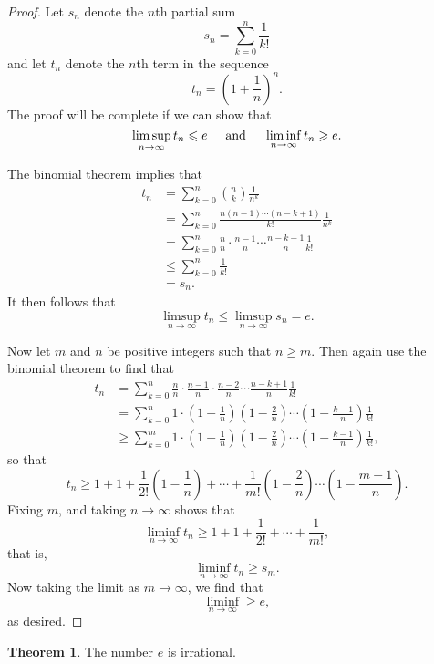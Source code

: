\documentclass[12pt]{article}
\theoremstyle{definition}
\theoremstyle{theorem}
\newtheorem{theorem}[definition]{Theorem}
\begin{document}
\begin{proof}
Let $s_n$ denote the $n$th partial sum 
\[
s_n = \sum_{k=0}^n \frac{1}{k!}
\]
and let $t_n$ denote the $n$th term in the sequence 
\[
t_n = \left(1 + \frac{1}{n}\right)^n.
\]
The proof will be complete if we can show that 
\[
\limsup_{n \to \infty}t_n \leqslant e \hspace{5mm} \text{and} \hspace{5mm} \liminf_{n \to \infty}t_n \geqslant e.
\] 

The binomial theorem implies that 
\begin{align*}
t_n &= \sum_{k=0}^n {{n}\choose{k}} \frac{1}{n^k} \\
&= \sum_{k=0}^n \frac{n(n-1) \cdots (n-k + 1)}{k!} \frac{1}{n^k} \\
&= \sum_{k=0}^n \frac{n}{n} \cdot \frac{n-1}{n} \cdots \frac{n-k+1}{n} \frac{1}{k!} \\
&\leqslant \sum_{k=0}^n \frac{1}{k!} \\
&= s_n.
\end{align*}
It then follows that 
\[
\limsup_{n\to \infty}t_n \leqslant \limsup_{n \to \infty}s_n = e.
\]

Now let $m$ and $n$ be positive integers such that $n \geqslant m$. Then again use the binomial theorem to find that 
\begin{align*}
t_n &= \sum_{k=0}^n \frac{n}{n} \cdot \frac{n-1}{n} \cdot \frac{n-2}{n}\cdots \frac{n-k+1}{n} \frac{1}{k!} \\
&= \sum_{k=0}^n 1 \cdot \left(1 - \frac{1}{n}\right)\left(1 - \frac{2}{n}\right)  \cdots \left(1 - \frac{k-1}{n}\right) \frac{1}{k!} \\
&\geqslant 
\sum_{k=0}^m 1 \cdot \left(1 - \frac{1}{n}\right)\left(1 - \frac{2}{n}\right) \cdots \left(1 - \frac{k-1}{n}\right) \frac{1}{k!},
\end{align*}
so that 
\[
t_n \geqslant 1 + 1 + \frac{1}{2!}\left(1 - \frac{1}{n}\right) + \cdots + \frac{1}{m!} \left(1 - \frac{2}{n}\right) \cdots \left(1 - \frac{m-1}{n}\right).
\]
Fixing $m$, and taking $n \to \infty$ shows that 
\[
\liminf_{n \to \infty} t_n \geqslant 1 + 1 + \frac{1}{2!} + \cdots + \frac{1}{m!},
\]
that is, 
\[
\liminf_{n \to \infty}t_n \geqslant s_m.
\]
Now taking the limit as $m \to \infty$, we find that 
\[
\liminf_{n \to \infty} \geqslant e,
\]
as desired. 
\end{proof}

\begin{theorem}
The number $e$ is irrational. 
\end{theorem}
\end{document}
